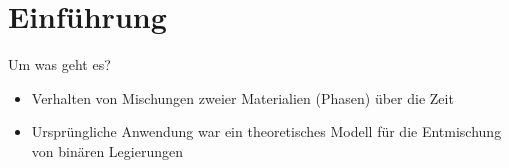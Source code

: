 
\section{Einführung}

\begin{frame}{Um was geht es?}
\begin{itemize}
\item<1-> Verhalten von Mischungen zweier Materialien (Phasen) über die Zeit
\item<2-> Ursprüngliche Anwendung war ein theoretisches Modell für die Entmischung von binären Legierungen
\end{itemize}
\end{frame}
